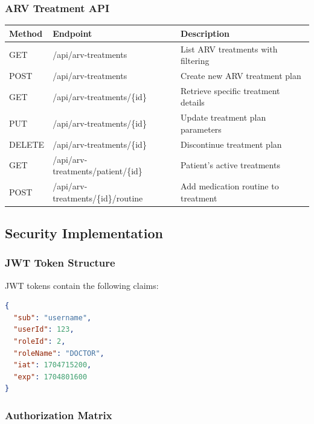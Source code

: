 \documentclass[12pt,a4paper]{article}
\begin{document}
\subsubsection{ARV Treatment API}

\begin{longtable}{|p{1.5cm}|p{4cm}|p{6.5cm}|}
\hline
\textbf{Method} & \textbf{Endpoint} & \textbf{Description} \\
\hline
GET & /api/arv-treatments & List ARV treatments with filtering \\
\hline
POST & /api/arv-treatments & Create new ARV treatment plan \\
\hline
GET & /api/arv-treatments/\{id\} & Retrieve specific treatment details \\
\hline
PUT & /api/arv-treatments/\{id\} & Update treatment plan parameters \\
\hline
DELETE & /api/arv-treatments/\{id\} & Discontinue treatment plan \\
\hline
GET & /api/arv-treatments/patient/\{id\} & Patient's active treatments \\
\hline
POST & /api/arv-treatments/\{id\}/routine & Add medication routine to treatment \\
\hline
\end{longtable}

\subsection{Security Implementation}

\subsubsection{JWT Token Structure}
JWT tokens contain the following claims:

\begin{lstlisting}[language=JSON]
{
  "sub": "username",
  "userId": 123,
  "roleId": 2,
  "roleName": "DOCTOR",
  "iat": 1704715200,
  "exp": 1704801600
}
\end{lstlisting}

\subsubsection{Authorization Matrix}
\end{document}
